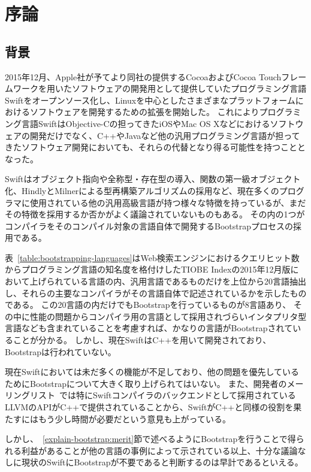 \chapter{序論}
\label{introduction}

\section{背景}
\label{introduction:background}

2015年12月、Apple社が予てより同社の提供するCocoaおよびCocoa Touchフレームワークを用いたソフトウェアの開発用として提供していたプログラミング言語Swiftをオープンソース化し、Linuxを中心としたさまざまなプラットフォームにおけるソフトウェアを開発するための拡張を開始した。
これによりプログラミング言語SwiftはObjective-Cの担ってきたiOSやMac OS Xなどにおけるソフトウェアの開発だけでなく、C++やJavaなど他の汎用プログラミング言語が担ってきたソフトウェア開発においても、それらの代替となり得る可能性を持つこととなった。

Swiftはオブジェクト指向や全称型・存在型の導入、関数の第一級オブジェクト化、HindlyとMilnerによる型再構築アルゴリズムの採用など、現在多くのプログラマに使用されている他の汎用高級言語が持つ様々な特徴を持っているが、まだその特徴を採用するか否かがよく議論されていないものもある。
その内の1つがコンパイラをそのコンパイル対象の言語自体で開発するBootstrapプロセスの採用である。

表~\ref{table:bootstrapping-languages}はWeb検索エンジンにおけるクエリヒット数からプログラミング言語の知名度を格付けしたTIOBE Indexの2015年12月版において上げられている言語の内、汎用言語であるものだけを上位から20言語抽出し、それらの主要なコンパイラがその言語自体で記述されているかを示したものである。
この20言語の内だけでもBootstrapを行っているものが8言語あり、 その中に性能の問題からコンパイラ用の言語として採用されづらいインタプリタ型言語なども含まれていることを考慮すれば、かなりの言語がBootstrapされていることが分かる。
しかし、現在SwiftはC++を用いて開発されており、Bootstrapは行われていない。

現在Swiftにおいては未だ多くの機能が不足しており、他の問題を優先しているためにBootstrapについて大きく取り上げられてはいない。
また、開発者のメーリングリスト~\cite{dev-ml}では特にSwiftコンパイラのバックエンドとして採用されているLLVMのAPIがC++で提供されていることから、SwiftがC++と同様の役割を果たすにはもう少し時間が必要だという意見も上がっている。


しかし、~\ref{explain-bootstrap:merit}節で述べるようにBootstrapを行うことで得られる利益があることが他の言語の事例によって示されている以上、十分な議論なしに現状のSwiftにBootstrapが不要であると判断するのは早計であるといえる。

